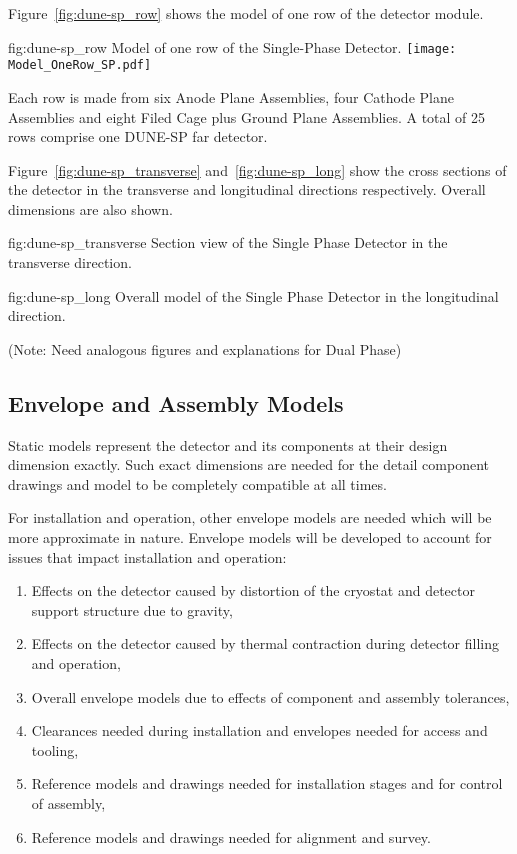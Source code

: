 Figure~\ref{fig:dune-sp_row} shows the model of one row of the
detector module.
\begin{dunefigure}{fig:dune-sp_row}
  {Model of one row of the Single-Phase Detector.}
  \texttt{[image: Model\_OneRow\_SP.pdf]}
\end{dunefigure}
Each row is made from six Anode Plane Assemblies,
four Cathode Plane Assemblies and eight Filed Cage plus Ground Plane
Assemblies. A total of 25 rows comprise one DUNE-SP far detector.

Figure~\ref{fig:dune-sp_transverse} and~\ref{fig:dune-sp_long} show
the cross sections of the detector in the transverse and longitudinal
directions respectively. Overall dimensions are also shown.
\begin{dunefigure}{fig:dune-sp_transverse}
  {Section view of the Single Phase Detector in the transverse direction.}
\end{dunefigure}
\begin{dunefigure}{fig:dune-sp_long}
  {Overall model of the Single Phase Detector in the longitudinal direction.}
\end{dunefigure}

(Note: Need analogous figures and explanations for Dual Phase)

\subsection{Envelope and Assembly Models}
\label{sec:fdsp-coord-integ-envelope}
Static models represent the detector and its components at their
design dimension exactly. Such exact dimensions are needed for the
detail component drawings and model to be completely compatible at all
times.

For installation and operation, other envelope models are needed which
will be more approximate in nature. Envelope models will be developed
to account for issues that impact installation and operation:
\begin{enumerate}
 \item Effects on the detector caused by distortion of the cryostat
   and detector support structure due to gravity,
 \item Effects on the detector caused by thermal contraction during
   detector filling and operation,
 \item Overall envelope models due to effects of component and
   assembly tolerances,
 \item Clearances needed during installation and envelopes needed for
   access and tooling,
 \item Reference models and drawings needed for installation stages
   and for control of assembly,
 \item Reference models and drawings needed for alignment and survey.
\end{enumerate}


